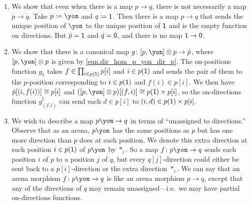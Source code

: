 \documentclass[Book-Poly]{subfiles}
\begin{document}
\begin{exercise}
\begin{solution}
\begin{enumerate}
	\item We show that even when there is a map $p \to q$, there is not necessarily a map $\dot{p}\to\dot{q}$.
	Take $p \coloneqq \yon$ and $q \coloneqq \textsf{1}$.
	Then there is a map $p \to q$ that sends the unique position of $\yon$ to the unique position of $\textsf{1}$ and is the empty function on directions.
	But $\dot{p} = \textsf{1}$ and $\dot{q} = \textsf{0}$, and there is no map $\textsf{1} \to \textsf{0}$.
	
	\item We show that there is a canonical map $g \colon \ihom{p,\yon} \otimes p \to \dot{p}$, where $\ihom{p,\yon} \otimes p$ is given by \eqref{eqn.dir_hom_p_yon_dir_p}.
	The on-positions function $g_1$ takes $f \in \prod_{i \in p(\textsf{1})} p[i]$ and $i \in p(\textsf{1})$ and sends the pair of them to the $\dot{p}$-position corresponding to $i \in p(\textsf{1})$ and $f(i) \in p[i]$.
	We then have $\dot{p}[(i, f(i))] \cong p[i]$ and $(\ihom{p,\yon} \otimes p)[(f, i)] \iso p(\1) \times p[i]$, so the on-directions function $g^\sharp_{(f,i)}$ can send each $d \in p[i]$ to $(i, d) \in p(\textsf{1}) \times p[i]$.

	\item We wish to describe a map $p\yon \to q$ in terms of ``unassigned to directions.''
	Observe that as an arena, $p\yon$ has the same positions as $p$ but has one more direction than $p$ does at each position.
	We denote this extra direction at each position $i \in p(\textsf{1})$ of $p\yon$ by $\ast_i$.
	So a map $f \colon p\yon\to q$ sends each position $i$ of $p$ to a position $j$ of $q$, but every $q[j]$-direction could either be sent back to a $p[i]$-direction or the extra direction $\ast_i$.
	We can say that an arena morphism $f \colon p\yon \to q$ is like an arena morphism $p \to q$, except that any of the directions of $q$ may remain unassigned---i.e.\ we may have partial on-directions functions.
\end{enumerate}
\end{solution}
\end{exercise}



\end{document}
